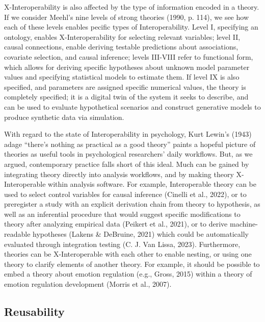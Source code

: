 \documentclass[
  man, noextraspace,floatsintext]{apa7}
\begin{document}
X-Interoperability is also affected by the type of information encoded in a theory.
If we consider Meehl's nine levels of strong theories (1990, p. 114),
we see how each of these levels enables pecific types of Interoperability.
Level I, specifying an ontology, enables X-Interoperability for selecting relevant variables;
level II, causal connections, enable deriving testable predictions about associations, covariate selection, and causal inference;
levels III-VIII refer to functional form,
which allows for deriving specific hypotheses about unknown model parameter values and specifying statistical models to estimate them.
If level IX is also specified, and parameters are assigned specific numerical values, the theory is completely specified; it is a digital twin of the system it seeks to describe, and can be used to evaluate hypothetical scenarios and construct generative models to produce synthetic data via simulation.

With regard to the state of Interoperability in psychology,
Kurt Lewin's (1943) adage ``there's nothing as practical as a good theory'' paints a hopeful picture of theories as useful tools in psychological researchers' daily workflows.
But, as we argued, contemporary practice falls short of this ideal.
Much can be gained by integrating theory directly into analysis workflows,
and by making theory X-Interoperable within analysis software.
For example, Interoperable theory can be used
to select control variables for causal inference (Cinelli et al., 2022),
or to preregister a study with an explicit derivation chain from theory to hypothesis,
as well as an inferential procedure that would suggest specific modifications to theory after analyzing empirical data (Peikert et al., 2021),
or to derive machine-readable hypotheses (Lakens \& DeBruine, 2021) which could be automatically evaluated through integration testing (C. J. Van Lissa, 2023).
Furthermore, theories can be X-Interoperable with each other to enable nesting, or using one theory to clarify elements of another theory.
For example, it should be possible to embed a theory about emotion regulation (e.g., Gross, 2015) within a theory of emotion regulation development (Morris et al., 2007).

\subsection{Reusability}\label{reusability}
\end{document}
